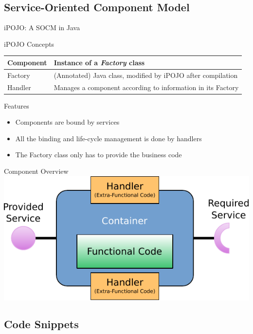 \subsection{Service-Oriented Component Model}

\begin{frame}{iPOJO: A SOCM in Java}
\begin{block}{iPOJO Concepts}
\begin{tabular}{lp{}}
Component & Instance of a \textit{Factory} class\\
\hline
Factory & (Annotated) Java class, modified by iPOJO after compilation\\
\hline
Handler & Manages a component according to information in its Factory\\
\end{tabular}
\end{block}

\begin{block}{Features}
\begin{itemize}
\item Components are bound by services
\item All the binding and life-cycle management is done by handlers
\item The Factory class only has to provide the business code
\end{itemize}
\end{block}
\end{frame}

\begin{frame}{Component Overview}
\centering
\includegraphics[width=\textwidth]{../imgs/cbse_component}
\end{frame}

\subsection{Code Snippets}

